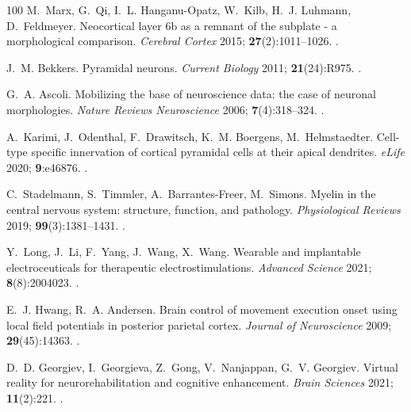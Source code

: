 \documentclass{ws-ijmpb}
\begin{document}
\begin{thebibliography}{100}
M.~Marx, G.~Qi, I.~L. Hanganu-Opatz, W.~Kilb, H.~J. Luhmann, D.~Feldmeyer.
  Neocortical layer 6b as a remnant of the subplate - a morphological
  comparison. \emph{Cerebral Cortex} 2015; \textbf{27}(2):1011--1026.
\newblock \href {http://doi.org/10.1093/cercor/bhv279}
  {}.

J.~M. Bekkers. Pyramidal neurons. \emph{Current Biology} 2011;
  \textbf{21}(24):R975.
\newblock \href {http://doi.org/10.1016/j.cub.2011.10.037}
  {}.

G.~A. Ascoli. Mobilizing the base of neuroscience data: the case of neuronal
  morphologies. \emph{Nature Reviews Neuroscience} 2006;
  \textbf{7}(4):318--324.
\newblock \href {http://doi.org/10.1038/nrn1885} {}.

A.~Karimi, J.~Odenthal, F.~Drawitsch, K.~M. Boergens, M.~Helmstaedter.
  Cell-type specific innervation of cortical pyramidal cells at their apical
  dendrites. \emph{eLife} 2020; \textbf{9}:e46876.
\newblock \href {http://doi.org/10.7554/eLife.46876}
  {}.

C.~Stadelmann, S.~Timmler, A.~Barrantes-Freer, M.~Simons. Myelin in the central
  nervous system: structure, function, and pathology. \emph{Physiological
  Reviews} 2019; \textbf{99}(3):1381--1431.
\newblock \href {http://doi.org/10.1152/physrev.00031.2018}
  {}.

Y.~Long, J.~Li, F.~Yang, J.~Wang, X.~Wang. Wearable and implantable
  electroceuticals for therapeutic electrostimulations. \emph{Advanced Science}
  2021; \textbf{8}(8):2004023.
\newblock \href {http://doi.org/10.1002/advs.202004023}
  {}.

E.~J. Hwang, R.~A. Andersen. Brain control of movement execution onset using
  local field potentials in posterior parietal cortex. \emph{Journal of
  Neuroscience} 2009; \textbf{29}(45):14363.
\newblock \href {http://doi.org/10.1523/jneurosci.2081-09.2009}
  {}.

D.~D. Georgiev, I.~Georgieva, Z.~Gong, V.~Nanjappan, G.~V. Georgiev. Virtual
  reality for neurorehabilitation and cognitive enhancement. \emph{Brain
  Sciences} 2021; \textbf{11}(2):221.
\newblock \href {http://doi.org/10.3390/brainsci11020221}
  {}.


\end{thebibliography}
\end{document}

